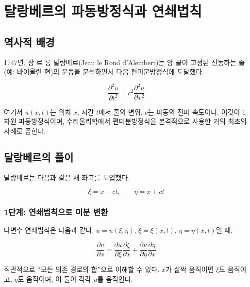 \documentclass[11pt,a4paper]{article}
\begin{document}
\section{달랑베르의 파동방정식과 연쇄법칙}

\subsection{역사적 배경}

1747년, 장 르 롱 달랑베르(Jean le Rond d'Alembert)는 양 끝이 고정된 진동하는 줄(예: 바이올린 현)의 운동을 분석하면서 다음 편미분방정식에 도달했다.

\begin{equation}
\frac{\partial^2 u}{\partial t^2} = c^2 \frac{\partial^2 u}{\partial x^2}
\label{eq:wave}
\end{equation}

여기서 $u(x,t)$는 위치 $x$, 시간 $t$에서 줄의 변위, $c$는 파동의 전파 속도이다. 이것이 1차원 파동방정식이며, 수리물리학에서 편미분방정식을 본격적으로 사용한 거의 최초의 사례로 꼽힌다.

\subsection{달랑베르의 풀이}

달랑베르는 다음과 같은 새 좌표를 도입했다.

\begin{equation}
\xi = x - ct, \qquad \eta = x + ct
\end{equation}

\subsubsection{1단계: 연쇄법칙으로 미분 변환}

다변수 연쇄법칙은 다음과 같다. $u = u(\xi, \eta)$, $\xi = \xi(x,t)$, $\eta = \eta(x,t)$일 때,

\begin{equation}
\frac{\partial u}{\partial x} = \frac{\partial u}{\partial \xi}\frac{\partial \xi}{\partial x} + \frac{\partial u}{\partial \eta}\frac{\partial \eta}{\partial x}
\end{equation}

직관적으로 ``모든 의존 경로의 합''으로 이해할 수 있다. $x$가 살짝 움직이면 $\xi$도 움직이고, $\eta$도 움직이며, 이 둘이 각각 $u$를 움직인다.
\end{document}
